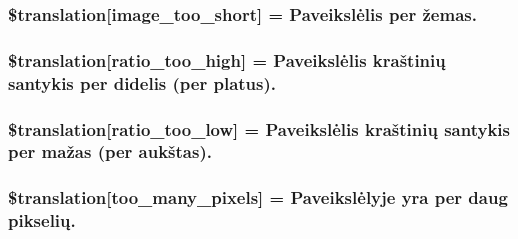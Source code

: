 \subsubsection[{\$translation}]{\setlength{\rightskip}{0pt plus 5cm}\$translation\mbox{[}\textquotesingle{}image\+\_\+too\+\_\+short\textquotesingle{}\mbox{]} = \textquotesingle{}Paveikslėlis per žemas.\textquotesingle{}}\label{class_8upload_8lt___l_t_8php_a86fcd4e1157b00032df451188d735527}
\hypertarget{class_8upload_8lt___l_t_8php_a23396f6ce7f31e5e5f1b57580621d982}{}
\subsubsection[{\$translation}]{\setlength{\rightskip}{0pt plus 5cm}\$translation\mbox{[}\textquotesingle{}ratio\+\_\+too\+\_\+high\textquotesingle{}\mbox{]} = \textquotesingle{}Paveikslėlis kraštinių santykis per didelis (per platus).\textquotesingle{}}\label{class_8upload_8lt___l_t_8php_a23396f6ce7f31e5e5f1b57580621d982}
\hypertarget{class_8upload_8lt___l_t_8php_ac533b9a479f056b0b8623e4268f068c2}{}
\subsubsection[{\$translation}]{\setlength{\rightskip}{0pt plus 5cm}\$translation\mbox{[}\textquotesingle{}ratio\+\_\+too\+\_\+low\textquotesingle{}\mbox{]} = \textquotesingle{}Paveikslėlis kraštinių santykis per mažas (per aukštas).\textquotesingle{}}\label{class_8upload_8lt___l_t_8php_ac533b9a479f056b0b8623e4268f068c2}
\hypertarget{class_8upload_8lt___l_t_8php_aa4051ef64e94a3f8295c63cf85544016}{}
\subsubsection[{\$translation}]{\setlength{\rightskip}{0pt plus 5cm}\$translation\mbox{[}\textquotesingle{}too\+\_\+many\+\_\+pixels\textquotesingle{}\mbox{]} = \textquotesingle{}Paveikslėlyje yra per daug pikselių.\textquotesingle{}}\label{class_8upload_8lt___l_t_8php_aa4051ef64e94a3f8295c63cf85544016}
\hypertarget{class_8upload_8lt___l_t_8php_a1fe342c27ce61f4ff4e0120ba647033e}{}
